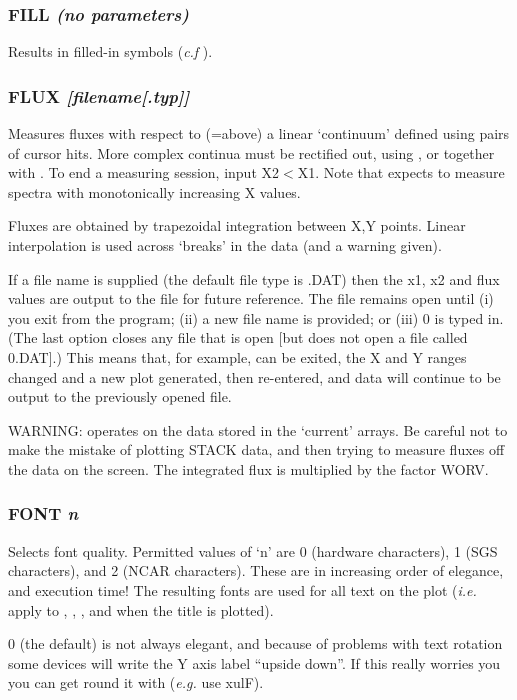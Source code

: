\documentclass[twoside,11pt,noabs,nolof]{starlink}
\providecommand{\dipcom}[3]{\subsubsection*{\label{COM:#1}\textbf{#1} \emph{#2}}}
\begin{document}
\dipcom{FILL}{(no parameters)}{Causes symbols created by {\texttt{MARK}} to be filled in}
Results in filled-in   symbols (\textit{c.f} ).

\dipcom{FLUX}{[filename[.typ]] }{Measures fluxes with respect to a linear 'continuum'}
Measures fluxes with respect to (=above) a linear `continuum' defined
using pairs of cursor hits. More complex continua must be rectified
out, using ,  or   together with .  To end a   measuring
session, input X2$<$X1. Note that   expects to measure spectra with
monotonically increasing X values.

Fluxes are obtained by trapezoidal integration between X,Y points.
Linear interpolation is used across `breaks' in the data (and a
warning given).

If a file name is supplied (the default file type is .DAT) then the
x1, x2 and flux values are output to the file for future reference.
The file remains open until (i) you exit from the program; (ii) a new
file name is provided; or (iii)   0 is typed in. (The last option
closes any file that is open [but does not open a file called 0.DAT].)
This means that, for example,   can be exited, the X and Y ranges
changed and a new plot generated, then   re-entered, and data will
continue to be output to the previously opened file.

WARNING:   operates on the data stored in the `current' arrays. Be
careful not to make the mistake of plotting STACK data, and then
trying to measure fluxes off the data on the screen. The integrated
flux is multiplied by the factor WORV.

\dipcom{FONT}{n}{Selects font quality}
Selects font quality. Permitted values of `n' are 0 (hardware
characters), 1 (SGS characters), and 2 (NCAR characters). These are in
increasing order of elegance, and execution time! The resulting fonts
are used for all text on the plot (\emph{i.e.} apply to ,  ,
,  and   when the title is plotted).

  0 (the default) is not always elegant, and because of problems
with text rotation some devices will write the Y axis label ``upside
down''. If this really worries you you can get round it with 
(\emph{e.g.} use   xulF).
\end{document}
